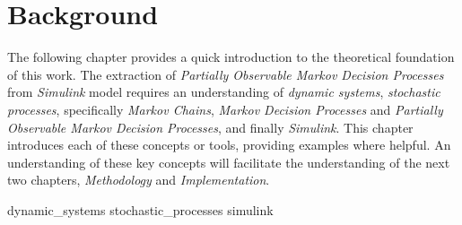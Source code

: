 \chapter{Background}

The following chapter provides a quick introduction to the theoretical foundation of this work. The extraction of \textit{Partially Observable Markov Decision Processes} from \textit{Simulink} model requires an understanding of \textit{dynamic systems}, \textit{stochastic processes}, specifically \textit{Markov Chains}, \textit{Markov Decision Processes} and \textit{Partially Observable Markov Decision Processes}, and finally \textit{Simulink}. This chapter introduces each of these concepts or tools, providing examples where helpful. An understanding of these key concepts will facilitate the understanding of the next two chapters, \textit{Methodology} and \textit{Implementation}.

{dynamic_systems}
{stochastic_processes}
{simulink}            
